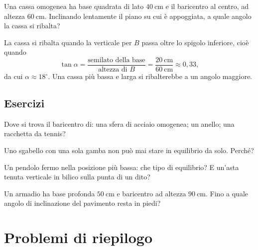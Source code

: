 \begin{testexample}
Una cassa omogenea ha base quadrata di lato $\SI{40}{\centi\meter}$ e il baricentro al centro, ad altezza $\SI{60}{\centi\meter}$. Inclinando lentamente il piano su cui è appoggiata, a quale angolo la cassa si ribalta?

La cassa si ribalta quando la verticale per $B$ passa oltre lo spigolo inferiore, cioè quando
\[
\tan\alpha = \frac{\text{semilato della base}}{\text{altezza di } B} = \frac{\SI{20}{\centi\meter}}{\SI{60}{\centi\meter}} \approx 0,33,
\]
da cui $\alpha \approx 18^\circ$. Una cassa più bassa e larga si ribalterebbe a un angolo maggiore.
\end{testexample}

\subsection{Esercizi}

\begin{esercizio}
Dove si trova il baricentro di: una sfera di acciaio omogenea; un anello; una racchetta da tennis?\\
\end{esercizio}

\begin{esercizio}
Uno sgabello con una sola gamba non può mai stare in equilibrio da solo. Perché?\\
\end{esercizio}

\begin{esercizio}
Un pendolo fermo nella posizione più bassa: che tipo di equilibrio? E un'asta tenuta verticale in bilico sulla punta di un dito?\\
\end{esercizio}

\begin{esercizio}
Un armadio ha base profonda $\SI{50}{\centi\meter}$ e baricentro ad altezza $\SI{90}{\centi\meter}$. Fino a quale angolo di inclinazione del pavimento resta in piedi?\\
\end{esercizio}


\section{Problemi di riepilogo}

